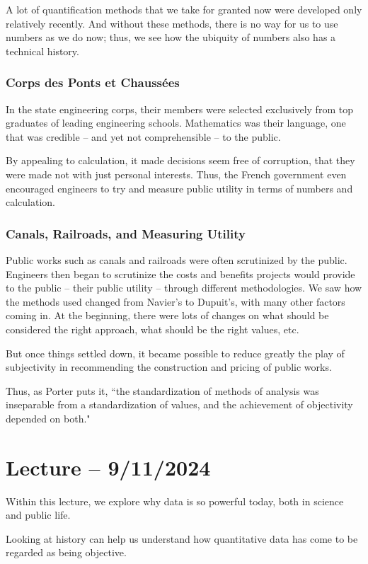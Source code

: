 \documentclass[openany]{book}
\begin{document}
A lot of quantification methods that we take for granted now were developed only relatively recently. And without these methods, there is no way for us to use numbers as we do now; thus, we see how the ubiquity of numbers also has a technical history.

\subsubsection{Corps des Ponts et Chauss\'{e}es}
In the state engineering corps, their members were selected exclusively from top graduates of leading engineering schools. Mathematics was their language, one that was credible -- and yet not comprehensible -- to the public.

By appealing to calculation, it made decisions seem free of corruption, that they were made not with just personal interests. Thus, the French government even encouraged engineers to try and measure public utility in terms of numbers and calculation.

\subsubsection{Canals, Railroads, and Measuring Utility}
Public works such as canals and railroads were often scrutinized by the public. Engineers then began to scrutinize the costs and benefits projects would provide to the public -- their public utility -- through different methodologies. We saw how the methods used changed from Navier's to Dupuit's, with many other factors coming in. At the beginning, there were lots of changes on what should be considered the right approach, what should be the right values, etc. 

But once things settled down, it became possible to reduce greatly the play of subjectivity in recommending the construction and pricing of public works.

Thus, as Porter puts it, ``the standardization of methods of analysis
was inseparable from a standardization of values, and the achievement
of objectivity depended on both."

\section{Lecture -- 9/11/2024}
Within this lecture, we explore why data is so powerful today, both in science and public life.

Looking at history can help us understand how quantitative data has come to be regarded as being objective.
\end{document}
